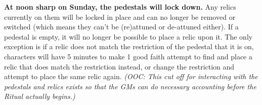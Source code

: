 \documentclass[green]{GL2020}
\begin{document}
\textbf{At noon sharp on Sunday, the pedestals will lock down.} Any relics currently on them will be locked in place and can no longer be removed or switched (which means they can’t be (re)attuned or de-attuned either). If a pedestal is empty, it will no longer be possible to place a relic upon it. The only exception is if a relic does not match the restriction of the pedestal that it is on, characters will have 5 minutes to make 1 good faith attempt to find and place a relic that does match the restriction instead, or change the restriction and attempt to place the same relic again. \emph{(OOC: This cut off for interacting with the pedestals and relics exists so that the GMs can do necessary accounting before the Ritual actually begins.)}
\end{document}
